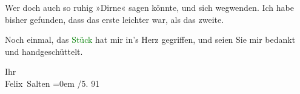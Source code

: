 \pstart
           Wer doch auch so ruhig »Dirne« sagen könnte, und sich wegwenden. Ich habe bisher
               gefunden, dass das erste {\pb}leichter war, als das zweite.\pend
           
\pstart
           Noch einmal, das \textcolor{green}{Stück}{}\ledrightnote{{$\rightarrow$}\textcolor{green}{Denksteine}} hat mir
               in’s Herz gegriffen, und seien Sie mir bedankt und handgeschüttelt.\pend
           
\pstart
           Ihr{\\[\baselineskip]}\spacefill\mbox{Felix Salten}\pend
           \leftskip=0em{}
/5.{ }91\pend
           \endnumbering{}  
      